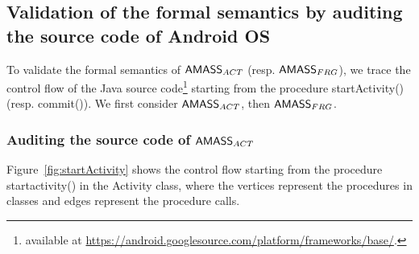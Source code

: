 \subsection{Validation of the formal semantics by auditing the source code of Android OS}\label{sec:val-code}
%
To validate the formal semantics of $\textsf{AMASS}_{ACT}$ (resp. $\textsf{AMASS}_{FRG}$), we trace the control flow of the Java source code\footnote{available at \url{https://android.googlesource.com/platform/frameworks/base/}.} starting from the procedure startActivity() (resp. commit()). %
We first consider $\textsf{AMASS}_{ACT}$, then $\textsf{AMASS}_{FRG}$. 
%

\subsubsection{Auditing the source code of $\textsf{AMASS}_{ACT}$}
Figure~\ref{fig:startActivity} shows the control flow starting from the procedure startactivity() in the Activity class, 
where the vertices represent the procedures in classes and edges represent the procedure calls. 

